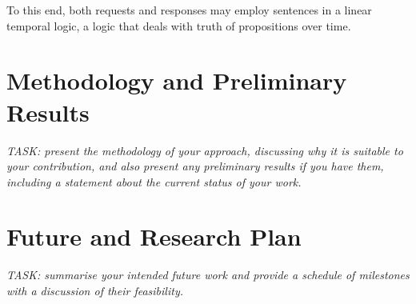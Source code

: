 \documentclass[conference]{IEEEtran}
\begin{document}
To this end, both requests and responses may employ sentences in a
linear temporal logic, a logic that deals with truth of propositions
over time\cite{2022-Live-Synthesis}.




\section{Methodology and Preliminary Results}

\emph{TASK: present the methodology of your approach, discussing why
it is suitable to your contribution, and also present any preliminary
results if you have them, including a statement about the current
status of your work.}

\section{Future and Research Plan}

\emph{TASK: summarise your intended future work and provide a schedule
of milestones with a discussion of their feasibility.}



\end{document}
